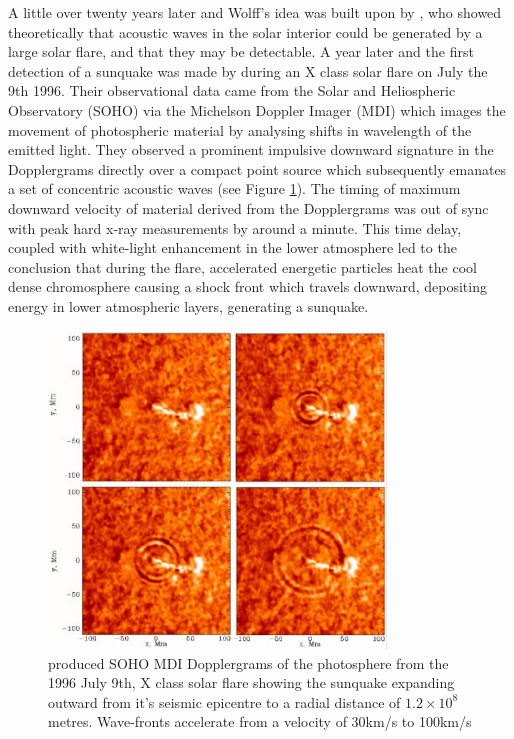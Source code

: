 A little over twenty years later and Wolff's idea was built upon by \cite{1995ESASP.376b.341K}, who showed theoretically that acoustic waves in the solar interior could be generated by a large solar flare, and that they may be detectable. A year later and the first detection of a sunquake was made by \cite{1998Natur.393..317K} during an X class solar flare on July the 9th 1996. Their observational data came from the Solar and Heliospheric Observatory (SOHO) via the Michelson Doppler Imager (MDI) which images the movement of photospheric material by analysing shifts in wavelength of the emitted light. They observed a prominent impulsive downward signature in the Dopplergrams directly over a compact point source which subsequently emanates a set of concentric acoustic waves (see Figure \ref{mdiquake96}). The timing of maximum downward velocity of material derived from the Dopplergrams was out of sync with peak hard x-ray measurements by around a minute. This time delay, coupled with white-light enhancement in the lower atmosphere led to the conclusion that during the flare, accelerated energetic particles heat the cool dense chromosphere causing a shock front which travels downward, depositing energy in lower atmospheric layers, generating a sunquake.

\begin{figure}[hb]
  \begin{center}
  \includegraphics[width=0.80\textwidth]{soho-mdi-quake-96}
\caption{\cite{1998Natur.393..317K} produced SOHO MDI Dopplergrams of the photosphere from the 1996 July 9th, X class solar flare showing the sunquake expanding outward from it's seismic epicentre to a radial distance of $1.2\times10^{8}$ metres. Wave-fronts accelerate from a velocity of 30km/s to 100km/s}\label{mdiquake96}
\end{center}
\end{figure}


